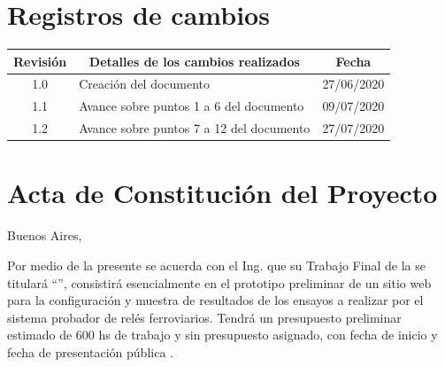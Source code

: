 \documentclass[11pt]{charter}
\begin{document}
\maketitle
\thispagestyle{empty}
\pagebreak


\thispagestyle{empty}
{\setlength{\parskip}{0pt}
\tableofcontents{}
}
\pagebreak


\section{Registros de cambios}
\label{sec:registro}


\begin{table}[ht]
\label{tab:registro}
\centering
\begin{tabularx}{\linewidth}{@{}|c|X|c|@{}}
\hline
\rowcolor[HTML]{C0C0C0} 
Revisión & \multicolumn{1}{c|}{\cellcolor[HTML]{C0C0C0}Detalles de los cambios realizados} & Fecha      \\ \hline
1.0      & Creación del documento                                          & 27/06/2020 \\ \hline
1.1      & Avance sobre puntos 1 a 6 del documento                                                               & 09/07/2020 \\ \hline
1.2      & Avance sobre puntos 7 a 12 del documento                                                               & 27/07/2020 \\ \hline
\end{tabularx}
\end{table}

\pagebreak



\section{Acta de Constitución del Proyecto}
\label{sec:acta}

\begin{flushright}
Buenos Aires, \fechaInicioName
\end{flushright}

\vspace{2cm}

Por medio de la presente se acuerda con el Ing. \authorname\hspace{1px} que su Trabajo Final de la \degreename\hspace{1px} se titulará ``\ttitle'', consistirá esencialmente en el prototipo preliminar de un sitio web para la configuración y muestra de resultados de los ensayos a realizar por el sistema probador de relés ferroviarios.
Tendrá un presupuesto preliminar estimado de 600 hs de trabajo y sin presupuesto asignado, con fecha de inicio \fechaInicioName\hspace{1px} y fecha de presentación pública \fechaFinalName.
\end{document}
